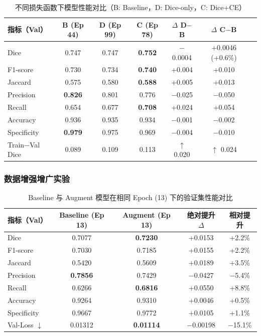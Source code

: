 \begin{table}[htbp]
    \centering
    \caption{不同损失函数下模型性能对比（B: Baseline，D: Dice-only，C: Dice+CE）}
    \label{tab:loss_ablation}
    \begin{tabular}{lcccccc}
        \toprule
        指标（Val） & B (Ep 44) & D (Ep 99) & C (Ep 78) & $\Delta$ D$-$B & $\Delta$ C$-$B \\
        \midrule
        Dice        & 0.747 & 0.747 & \textbf{0.752} & $-$0.0004 & +0.0046 (+0.6\%) \\
        F1-score    & 0.730 & 0.734 & \textbf{0.740} & +0.004 & +0.010 \\
        Jaccard     & 0.575 & 0.580 & \textbf{0.588} & +0.005 & +0.013 \\
        Precision   & \textbf{0.826} & 0.801 & 0.776 & $-$0.025 & $-$0.050 \\
        Recall      & 0.654 & 0.677 & \textbf{0.708} & +0.024 & +0.054 \\
        Accuracy    & 0.936 & 0.935 & 0.934 & $-$0.001 & $-$0.002 \\
        Specificity & \textbf{0.979} & 0.975 & 0.969 & $-$0.004 & $-$0.010 \\
        Train$-$Val Dice & 0.089 & 0.109 & 0.113 & $\uparrow$ 0.020 & $\uparrow$ 0.024 \\
        \bottomrule
    \end{tabular}
\end{table}

\subsubsection{数据增强增广实验}

\begin{table}[htbp]
    \centering
    \caption{Baseline 与 Augment 模型在相同 Epoch (13) 下的验证集性能对比}
    \label{tab:augment_ep13}
    \begin{tabular}{lcccc}
        \toprule
        指标（Val） & Baseline (Ep 13) & Augment (Ep 13) & 绝对提升 $\Delta$ & 相对提升 \\
        \midrule
        Dice        & 0.7077 & \textbf{0.7230} & +0.0153 & +2.2\% \\
        F1-score    & 0.7030 & 0.7185 & +0.0155 & +2.2\% \\
        Jaccard     & 0.5420 & 0.5609 & +0.0189 & +3.5\% \\
        Precision   & \textbf{0.7856} & 0.7429 & $-$0.0427 & $-$5.4\% \\
        Recall      & 0.6266 & \textbf{0.6816} & +0.0550 & +8.8\% \\
        Accuracy    & 0.9264 & 0.9310 & +0.0046 & +0.5\% \\
        Specificity & 0.9667 & 0.9772 & +0.0105 & +1.1\% \\
        Val-Loss $\downarrow$ & 0.01312 & \textbf{0.01114} & $-$0.00198 & $-$15.1\% \\
        \bottomrule
    \end{tabular}
\end{table}


